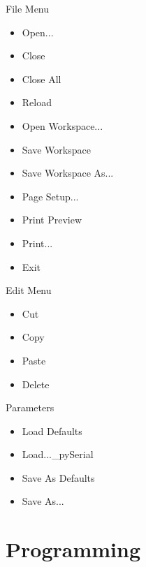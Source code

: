 \documentclass[letterpaper,10pt,english]{sphinxmanual}
\begin{document}
File Menu
\begin{itemize}
\item {} 
Open...

\item {} 
Close

\item {} 
Close All

\item {} 
Reload

\item {} 
Open Workspace...

\item {} 
Save Workspace

\item {} 
Save Workspace As...

\item {} 
Page Setup...

\item {} 
Print Preview

\item {} 
Print...

\item {} 
Exit

\end{itemize}

Edit Menu
\begin{itemize}
\item {} 
Cut

\item {} 
Copy

\item {} 
Paste

\item {} 
Delete

\end{itemize}

Parameters
\begin{itemize}
\item {} 
Load Defaults

\item {} 
Load...\_pySerial

\item {} 
Save As Defaults

\item {} 
Save As...

\end{itemize}


\chapter{Programming}
\label{programming:programming}\label{programming:scipy}\label{programming::doc}\label{programming:id1}
\end{document}
